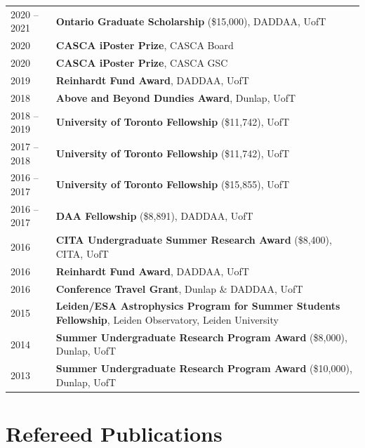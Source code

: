 \documentclass[10pt]{res} %
\begin{document}
\begin{resume}
\begin{table}[h!]
\begin{tabularx}{\textwidth}{lX}
2020 -- 2021 & \textbf{Ontario Graduate Scholarship} (\$15,000), DADDAA, UofT  \\
2020 & \textbf{CASCA iPoster Prize}, CASCA Board \\
2020 & \textbf{CASCA iPoster Prize}, CASCA GSC \\
2019 & \textbf{Reinhardt Fund Award}, DADDAA, UofT \\
2018 & \textbf{Above and Beyond Dundies Award}, Dunlap, UofT \\
2018 -- 2019 & \textbf{University of Toronto Fellowship} (\$11,742), UofT \\
2017 -- 2018 & \textbf{University of Toronto Fellowship} (\$11,742), UofT \\
2016 -- 2017 & \textbf{University of Toronto Fellowship} (\$15,855), UofT \\
2016 -- 2017 & \textbf{DAA Fellowship} (\$8,891), DADDAA, UofT \\
2016 & \textbf{CITA Undergraduate Summer Research Award} (\$8,400), CITA, UofT \\
2016 & \textbf{Reinhardt Fund Award}, DADDAA, UofT \\
2016 & \textbf{Conference Travel Grant}, Dunlap \& DADDAA, UofT \\
2015 & \textbf{Leiden/ESA Astrophysics Program for Summer Students Fellowship}, Leiden Observatory, Leiden University \\
2014 & \textbf{Summer Undergraduate Research Program Award} (\$8,000), Dunlap, UofT \\
2013 & \textbf{Summer Undergraduate Research Program Award} (\$10,000), Dunlap, UofT
\end{tabularx}
\end{table}


\section{\Large Refereed Publications}
\vspace{-5pt} %
\noindent\makebox[\linewidth]{\rule{\textwidth}{0.4pt}}
\vspace{-20pt} %


\end{resume}
\end{document}
